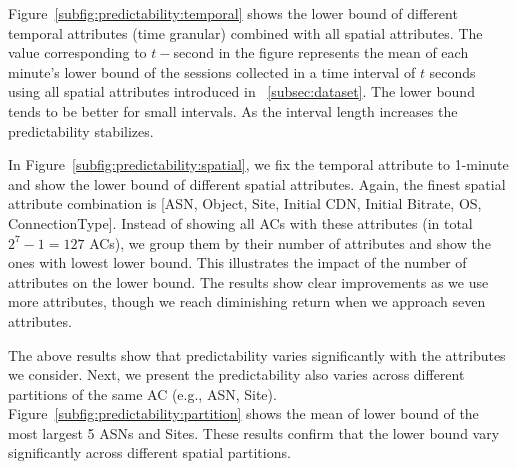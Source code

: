  Figure~\ref{subfig:predictability:temporal} shows the lower bound of different temporal attributes (time granular) combined with all spatial attributes. The value corresponding to $t-$second in the figure represents the mean of each minute's lower bound of the sessions collected in a time interval of $t$ seconds using all spatial attributes introduced in \Section~\ref{subsec:dataset}. The lower bound tends to be better for small intervals. As the interval length increases the predictability stabilizes.

 In Figure~\ref{subfig:predictability:spatial}, we fix the temporal attribute to 1-minute and show the lower bound of different spatial attributes. Again, the finest spatial attribute combination is [ASN, Object, Site, Initial CDN, Initial Bitrate, OS, ConnectionType].  Instead of showing all ACs with these attributes (in total $2^7-1=127$ ACs), we group them by their number of attributes and show the ones with lowest lower bound. This illustrates the impact of the number of attributes on the lower bound. The results show clear improvements as we use more attributes, though we reach diminishing return when we approach seven attributes.

 The above results show that predictability varies significantly with the attributes we consider. Next, we present the predictability also varies across different partitions of the same AC (e.g., ASN, Site). Figure~\ref{subfig:predictability:partition} shows the mean of lower bound of the most largest 5 ASNs and Sites. These results confirm that the lower bound vary significantly across different spatial partitions. 



